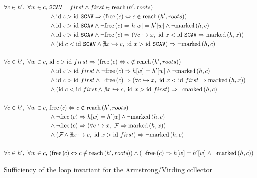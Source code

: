\begin{lemma}
  \begin{figure}[t]
    \centering
    \begin{align*}
      \forall c \in h',\ \forall w \in c,\ &\mathtt{SCAV} = first \land
        first \in \reach{h'}{roots}\\
%
      &\land \id~c > \id~\mathtt{SCAV} \implies (\free{c}
        \iff c \notin \reach{h'}{roots})\\
%
      &\land \id~c > \id~\mathtt{SCAV} \land \lnot\free{c}
        \implies h[w] = h'[w] \land \lnot \marked{h}{c}\\
%
      &\land \id~c > \id~\mathtt{SCAV} \land \lnot\free{c}
        \implies (\forall c \pointsto x,\ \id~x < \id~\mathtt{SCAV}
        \implies \marked{h}{x})\\
%
      &\land \left(\id~c < \id~\mathtt{SCAV} \land \nexists x \pointsto
        c,\ \id~x > \id~\mathtt{SCAV}\right) \implies
        \lnot\marked{h}{c}\\\\
%
%
      \forall c \in h',\ \forall w \in c,\ & \id~c > \id~first \implies
        (\free{c} \iff c \notin \reach{h'}{roots})\\
%
      &\land \id~c > \id~first \land \lnot\free{c}
        \implies h[w] = h'[w] \land \lnot \marked{h}{c}\\
%
      &\land \id~c > \id~first \land \lnot\free{c}
        \implies (\forall c \pointsto x,\ \id~x < \id~first
        \implies \marked{h}{x})\\
%
      &\land \left(\id~c < \id~first \land \nexists x \pointsto
        c,\ \id~x > \id~first\right) \implies
        \lnot\marked{h}{c}\\\\
%
%
      \forall c \in h',\ \forall w \in c,\ & \free{c} \iff c \notin
        \reach{h'}{roots}\\
%
      &\land \lnot\free{c} \implies h[w] = h'[w] \land \lnot \marked{h}{c}\\
%
      &\land \lnot\free{c} \implies (\forall c \pointsto x,\
        \lfalse \implies \marked{h}{x})\\
%
      &\land \left(\lfalse \land \nexists x \pointsto
        c,\ \id~x > \id~first\right) \implies
        \lnot\marked{h}{c}\\\\
%
%
      \forall c \in h',\ \forall w \in c,\ & (\free{c} \iff c \notin
        \reach{h'}{roots}) \land (\lnot\free{c} \implies h[w] = h'[w] \land
        \lnot \marked{h}{c})
    \end{align*}
    \caption{Sufficiency of the loop invariant for the Armstrong/Virding collector}
    \label{fig:marksweep-example-partial-sufficient}
  \end{figure}


\end{lemma}
